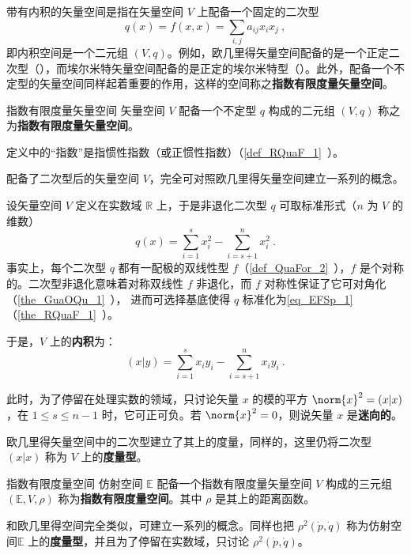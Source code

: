 
\begin{issues}
\issueDraft
\end{issues}

带有内积的矢量空间是指在矢量空间 $V$ 上配备一个固定的二次型
\begin{equation}
q(x)=f(x,x)=\sum_{i,j}a_{ij}x_ix_j~,
\end{equation}
 即内积空间是一个二元组 $(V,q)$。例如，欧几里得矢量空间配备的是一个正定二次型（），而埃尔米特矢量空间配备的是正定的埃尔米特型（）。此外，配备一个不定型的矢量空间同样起着重要的作用，这样的空间称之\textbf{指数有限度量矢量空间}。

 \begin{definition}{指数有限度量矢量空间}
 矢量空间 $V$ 配备一个不定型 $q$ 构成的二元组 $(V,q)$ 称之为\textbf{指数有限度量矢量空间}。
 \end{definition}
定义中的“指数”是指惯性指数（或正惯性指数）（\autoref{def_RQuaF_1}~）。

配备了二次型后的矢量空间 $V$，完全可对照欧几里得矢量空间建立一系列的概念。

设矢量空间 $V$ 定义在实数域 $\mathbb R$ 上，于是非退化二次型 $q$ 可取标准形式（$n$ 为 $V$ 的维数）
\begin{equation}\label{eq_EFSp_1}
q(x)=\sum_{i=1}^s x_i^2-\sum_{i=s+1}^n x_i^2~.
\end{equation}
事实上，每个二次型 $q$ 都有一配极的双线性型 $f$（\autoref{def_QuaFor_2}~），$f$ 是个对称的。二次型非退化意味着对称双线性 $f$ 非退化，而 $f$ 对称性保证了它可对角化（\autoref{the_GuaOQu_1}~）， 进而可选择基底使得 $q$ 标准化为\autoref{eq_EFSp_1} （\autoref{the_RQuaF_1}~）。

于是，$V$ 上的\textbf{内积}为：
\begin{equation}
(x|y)=\sum_{i=1}^{s}x_iy_i-\sum_{i=s+1}^{n}x_{i}y_i~.
\end{equation}

此时，为了停留在处理实数的领域，只讨论矢量 $x$ 的模的平方 $\norm{x}^2=(x|x)$，在 $1\leq s\leq n-1$ 时，它可正可负。若 $\norm{x}^2=0$，则说矢量 $x$ 是\textbf{迷向的}。

欧几里得矢量空间中的二次型建立了其上的度量，同样的，这里仍将二次型 $(x|x)$ 称为 $V$ 上的\textbf{度量型}。
\begin{definition}{指数有限度量空间}
 仿射空间 $\mathbb E$ 配备一个指数有限度量矢量空间 $V$ 构成的三元组 $(\mathbb E,V,\rho)$ 称为\textbf{指数有限度量空间}。其中 $\rho$ 是其上的距离函数。
 \end{definition}
 和欧几里得空间完全类似，可建立一系列的概念。同样也把 $\rho^2(\dot p,\dot q)$ 称为仿射空间$\mathbb E$ 上的\textbf{度量型}，并且为了停留在实数域，只讨论 $\rho^2(\dot p,\dot q)$。


